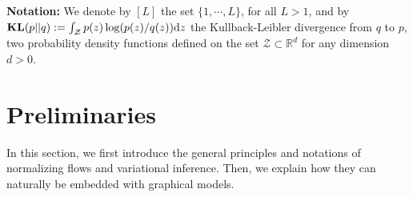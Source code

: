 \documentclass{article}
\begin{document}
 \textbf{Notation:} We denote by $[L]$ the set $ \{1, \cdots, L\}$, for all $L >1$, and by $\textbf{\text{KL}}(p || q ) := \int_{\mathcal{Z}} p(z) \log(p(z)/q(z)) \mathrm{d}z$ the Kullback-Leibler divergence from $q$ to $p$, two probability density functions defined on the set $\mathcal{Z} \subset \mathbb{R}^d$ for any dimension $d >0$.

\vspace{-0.05in}
\section{Preliminaries}\label{sec:prelim}
\vspace{-0.05in}
In this section, we first introduce the general principles and notations of normalizing flows and variational inference. 
Then, we explain how they can naturally be embedded with graphical models.
\end{document}

